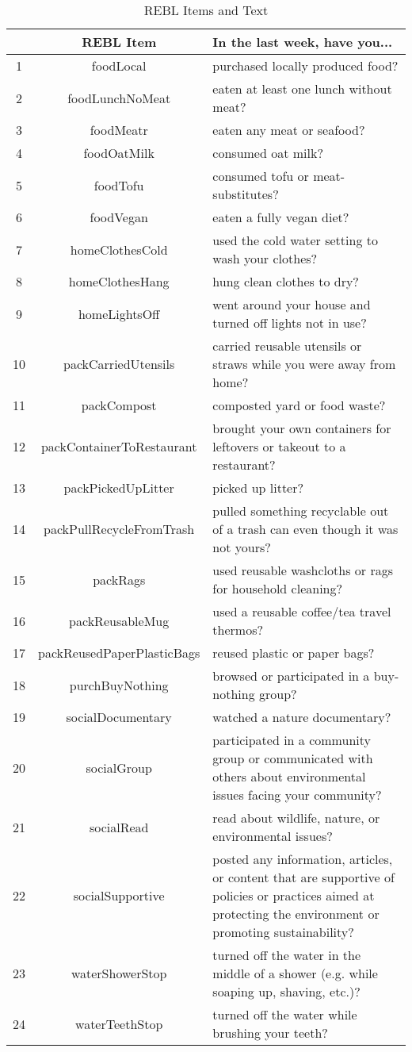 \begin{table}[ht]
\centering
\begingroup\footnotesize
\begin{tabular}{ccp{7cm}}
  \hline
 & REBL Item & In the last week, have you... \\ 
  \hline
1 & foodLocal & purchased locally produced food? \\ 
  2 & foodLunchNoMeat & eaten at least one lunch without meat? \\ 
  3 & foodMeatr & eaten any meat or seafood? \\ 
  4 & foodOatMilk & consumed oat milk? \\ 
  5 & foodTofu & consumed tofu or meat-substitutes? \\ 
  6 & foodVegan & eaten a fully vegan diet? \\ 
  7 & homeClothesCold & used the cold water setting to wash your clothes? \\ 
  8 & homeClothesHang & hung clean clothes to dry? \\ 
  9 & homeLightsOff & went around your house and turned off lights not in use? \\ 
  10 & packCarriedUtensils & carried reusable utensils or straws while you were away from home? \\ 
  11 & packCompost & composted yard or food waste? \\ 
  12 & packContainerToRestaurant & brought your own containers for leftovers or takeout to a restaurant? \\ 
  13 & packPickedUpLitter & picked up litter? \\ 
  14 & packPullRecycleFromTrash & pulled something recyclable out of a trash can even though it was not yours? \\ 
  15 & packRags & used reusable washcloths or rags for household cleaning? \\ 
  16 & packReusableMug & used a reusable coffee/tea travel thermos? \\ 
  17 & packReusedPaperPlasticBags & reused plastic or paper bags? \\ 
  18 & purchBuyNothing & browsed or participated in a buy-nothing group? \\ 
  19 & socialDocumentary & watched a nature documentary? \\ 
  20 & socialGroup & participated in a community group or communicated with others about environmental issues facing your community? \\ 
  21 & socialRead & read about wildlife, nature, or environmental issues? \\ 
  22 & socialSupportive & posted any information, articles, or content that are supportive of policies or practices aimed at protecting the environment or promoting sustainability? \\ 
  23 & waterShowerStop & turned off the water in the middle of a shower (e.g. while soaping up, shaving, etc.)? \\ 
  24 & waterTeethStop & turned off the water while brushing your teeth? \\ 
   \hline
\end{tabular}
\endgroup
\caption{REBL Items and Text} 
\label{rebl_text}
\end{table}
